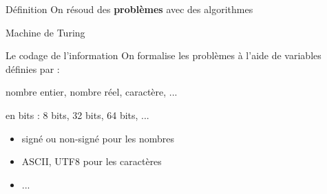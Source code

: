 \begin{frame}{Définition}
    On résoud des \textbf{problèmes} avec des algorithmes
\end{frame}

\begin{frame}{Machine de Turing}
\end{frame}

\begin{frame}{Le codage de l'information}
    On formalise les problèmes à l'aide de variables définies par :
    \begin{description}[<+->]
        \item [Le TYPE] nombre entier, nombre réel, caractère, ...
        \item [La TAILLE] en bits : 8 bits, 32 bits, 64 bits, ...
        \item [Le CODAGE] 
        \begin{itemize}
            \item signé ou non-signé pour les nombres
            \item ASCII, UTF8 pour les caractères
            \item ...
        \end{itemize}
    \end{description}
\end{frame}

